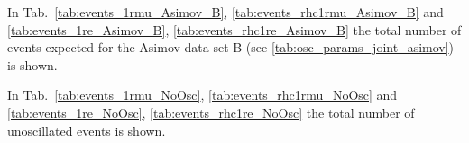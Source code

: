 %
%

In Tab.~\ref{tab:events_1rmu_Asimov_B},
\ref{tab:events_rhc1rmu_Asimov_B} and
\ref{tab:events_1re_Asimov_B},
\ref{tab:events_rhc1re_Asimov_B} 
the total number of events expected for the Asimov data set B (see \cref{tab:osc_params_joint_asimov}) is shown.

\clearpage







\newpage
\clearpage

In Tab.~\ref{tab:events_1rmu_NoOsc},
\ref{tab:events_rhc1rmu_NoOsc} and
\ref{tab:events_1re_NoOsc},
\ref{tab:events_rhc1re_NoOsc}
the total number of unoscillated events is shown.
 






\clearpage





